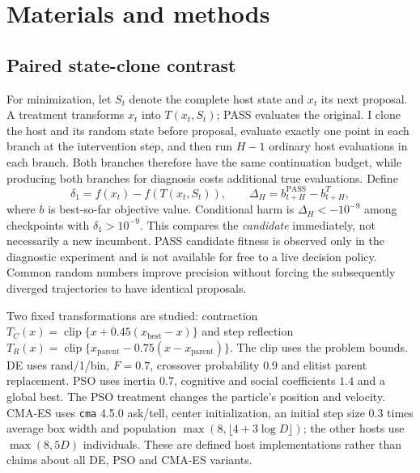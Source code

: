 \documentclass[10pt,letterpaper]{article}
\begin{document}
\section*{Materials and methods}
\subsection*{Paired state-clone contrast}
For minimization, let $S_t$ denote the complete host state and $x_t$ its next proposal. A treatment transforms $x_t$ into $T(x_t,S_t)$; PASS evaluates the original. I clone the host and its random state before proposal, evaluate exactly one point in each branch at the intervention step, and then run $H-1$ ordinary host evaluations in each branch. Both branches therefore have the same continuation budget, while producing both branches for diagnosis costs additional true evaluations. Define
\begin{equation}
\delta_1=f(x_t)-f(T(x_t,S_t)),\qquad
\Delta_H=b_{t+H}^{\mathrm{PASS}}-b_{t+H}^{T},
\end{equation}
where $b$ is best-so-far objective value. Conditional harm is $\Delta_H<-10^{-9}$ among checkpoints with $\delta_1>10^{-9}$. This compares the \emph{candidate} immediately, not necessarily a new incumbent. PASS candidate fitness is observed only in the diagnostic experiment and is not available for free to a live decision policy. Common random numbers improve precision without forcing the subsequently diverged trajectories to have identical proposals.

Two fixed transformations are studied: contraction $T_C(x)=\operatorname{clip}\{x+0.45(x_{\mathrm{best}}-x)\}$ and step reflection $T_R(x)=\operatorname{clip}\{x_{\mathrm{parent}}-0.75(x-x_{\mathrm{parent}})\}$. The clip uses the problem bounds. DE uses rand/1/bin, $F=0.7$, crossover probability $0.9$ and elitist parent replacement. PSO uses inertia $0.7$, cognitive and social coefficients $1.4$ and a global best. The PSO treatment changes the particle's position and velocity. CMA-ES uses \texttt{cma} 4.5.0 ask/tell, center initialization, an initial step size $0.3$ times average box width and population $\max(8,\lfloor4+3\log D\rfloor)$; the other hosts use $\max(8,5D)$ individuals. These are defined host implementations rather than claims about all DE, PSO and CMA-ES variants.
\end{document}
